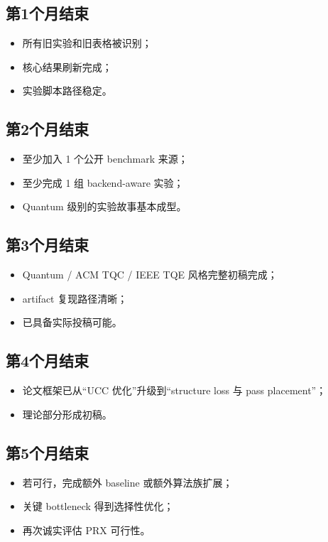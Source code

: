 \documentclass[11pt]{article}
\begin{document}
\subsection*{第1个月结束}
\begin{itemize}
    \item 所有旧实验和旧表格被识别；
    \item 核心结果刷新完成；
    \item 实验脚本路径稳定。
\end{itemize}

\subsection*{第2个月结束}
\begin{itemize}
    \item 至少加入 1 个公开 benchmark 来源；
    \item 至少完成 1 组 backend-aware 实验；
    \item Quantum 级别的实验故事基本成型。
\end{itemize}

\subsection*{第3个月结束}
\begin{itemize}
    \item Quantum / ACM TQC / IEEE TQE 风格完整初稿完成；
    \item artifact 复现路径清晰；
    \item 已具备实际投稿可能。
\end{itemize}

\subsection*{第4个月结束}
\begin{itemize}
    \item 论文框架已从“UCC 优化”升级到“structure loss 与 pass placement”；
    \item 理论部分形成初稿。
\end{itemize}

\subsection*{第5个月结束}
\begin{itemize}
    \item 若可行，完成额外 baseline 或额外算法族扩展；
    \item 关键 bottleneck 得到选择性优化；
    \item 再次诚实评估 PRX 可行性。
\end{itemize}
\end{document}

